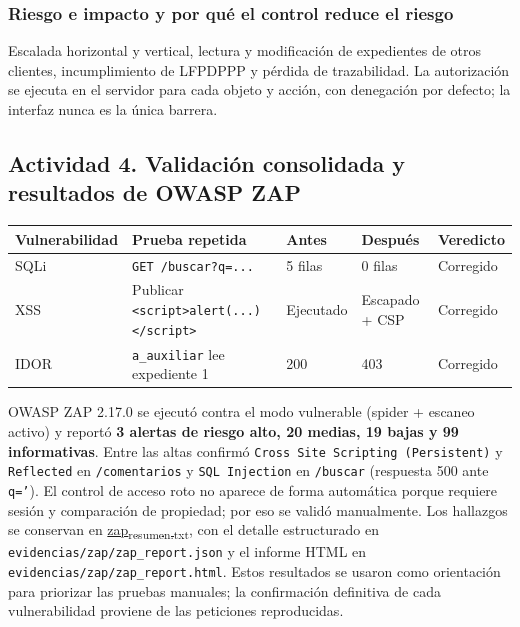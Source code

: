 \documentclass[letterpaper]{article}
\begin{document}
\subsubsection{Riesgo e impacto y por qué el control reduce el riesgo}
\label{sec:org56b28d1}

Escalada horizontal y vertical, lectura y modificación de expedientes de otros
clientes, incumplimiento de LFPDPPP y pérdida de trazabilidad. La autorización se
ejecuta en el servidor para cada objeto y acción, con denegación por defecto; la
interfaz nunca es la única barrera.
\subsection{Actividad 4. Validación consolidada y resultados de OWASP ZAP}
\label{sec:org11c5b4d}

\begin{center}
\begin{tabularx}{\textwidth}{X|X|X|X|X}
Vulnerabilidad & Prueba repetida & Antes & Después & Veredicto\\
\hline
SQLi & \texttt{GET /buscar?q=...} & 5 filas & 0 filas & Corregido\\
XSS & Publicar \texttt{<script>alert(...)</script>} & Ejecutado & Escapado + CSP & Corregido\\
IDOR & \texttt{a\_auxiliar} lee expediente 1 & 200 & 403 & Corregido\\
\end{tabularx}
\end{center}

OWASP ZAP 2.17.0 se ejecutó contra el modo vulnerable (spider + escaneo activo) y
reportó \textbf{3 alertas de riesgo alto, 20 medias, 19 bajas y 99 informativas}. Entre las
altas confirmó \texttt{Cross Site Scripting (Persistent)} y \texttt{Reflected} en \texttt{/comentarios} y
\texttt{SQL Injection} en \texttt{/buscar} (respuesta 500 ante \texttt{q='}). El control de acceso roto no
aparece de forma automática porque requiere sesión y comparación de propiedad; por eso
se validó manualmente. Los hallazgos se conservan en
\href{evidencias/zap/zap\_resumen.txt}{zap\textsubscript{resumen.txt}}, con el detalle estructurado en
\texttt{evidencias/zap/zap\_report.json} y el informe HTML en \texttt{evidencias/zap/zap\_report.html}.
Estos resultados se usaron como orientación para priorizar las pruebas manuales; la
confirmación definitiva de cada vulnerabilidad proviene de las peticiones reproducidas.
\end{document}
